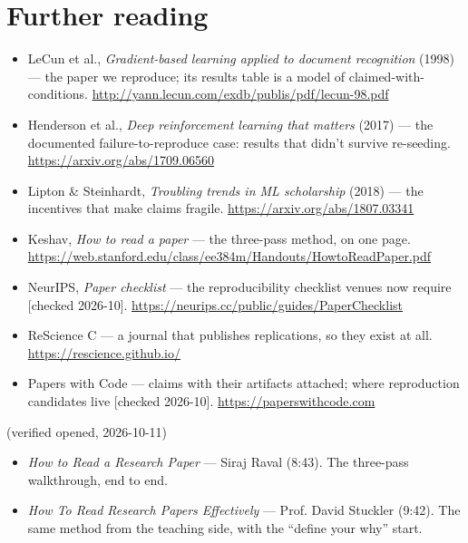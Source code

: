 \section*{Further reading}
\label{sec:further17}
\begin{itemize}
\item LeCun et al., \emph{Gradient-based learning applied to
document recognition} (1998) --- the paper we reproduce; its
results table is a model of claimed-with-conditions.
\url{http://yann.lecun.com/exdb/publis/pdf/lecun-98.pdf}
\item Henderson et al., \emph{Deep reinforcement learning that
matters} (2017) --- the documented failure-to-reproduce case:
results that didn't survive re-seeding.
\url{https://arxiv.org/abs/1709.06560}
\item Lipton \& Steinhardt, \emph{Troubling trends in ML
scholarship} (2018) --- the incentives that make claims fragile.
\url{https://arxiv.org/abs/1807.03341}
\item Keshav, \emph{How to read a paper} --- the three-pass method,
on one page.
\url{https://web.stanford.edu/class/ee384m/Handouts/HowtoReadPaper.pdf}
\item NeurIPS, \emph{Paper checklist} --- the reproducibility
checklist venues now require [checked 2026-10].
\url{https://neurips.cc/public/guides/PaperChecklist}
\item ReScience C --- a journal that publishes replications, so
they exist at all.
\url{https://rescience.github.io/}
\item Papers with Code --- claims with their artifacts attached;
where reproduction candidates live [checked 2026-10].
\url{https://paperswithcode.com}
\end{itemize}

\begin{rulebox}
(verified opened, 2026-10-11)
\begin{itemize}
\item \emph{How to Read a Research Paper} --- Siraj Raval (8:43).
The three-pass walkthrough, end to end.
\item \emph{How To Read Research Papers Effectively} --- Prof.
David Stuckler (9:42). The same method from the teaching side,
with the ``define your why'' start.
\end{itemize}
\end{rulebox}

